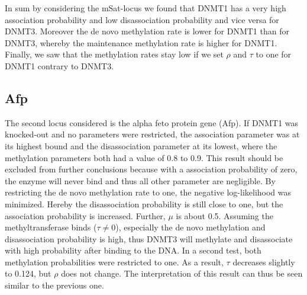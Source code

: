 In sum by considering the mSat-locus we found that DNMT1 has a very high association probability and low disassociation probability and vice versa for DNMT3. Moreover the de novo methylation rate is lower for DNMT1 than for DNMT3, whereby the maintenance methylation rate is higher for DNMT1. Finally, we saw that the methylation rates stay low if we set $\rho$ and $\tau$ to one for DNMT1 contrary to DNMT3.

\subsection{Afp}
\label{Afp}
The second locus considered is the alpha feto protein gene (Afp). If DNMT1 was knocked-out and no parameters were restricted, the association parameter was at its highest bound and the disassociation parameter at its lowest, where the methylation parameters both had a value of 0.8 to 0.9. This result should be excluded from further conclusions because with a association probability of zero, the enzyme will never bind and thus all other parameter are negligible.\newline
By restricting the de novo methylation rate to one, the negative log-likelihood was minimized. Hereby the disassociation probability is still close to one, but the association probability is increased. Further, $\mu$ is about 0.5. Assuming the methyltransferase binds ($\tau \neq 0$), especially the de novo methylation and disassociation probability is high, thus DNMT3 will methylate and disassociate with high probability after binding to the DNA.\newline
In a second test, both methylation probabilities were restricted to one. As a result, $\tau$ decreases slightly to 0.124, but $\rho$ does not change. The interpretation of this result can thus be seen similar to the previous one.\\

